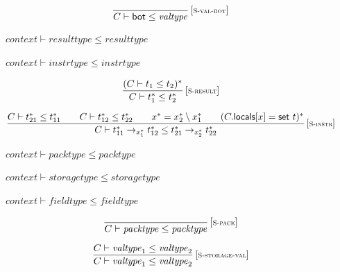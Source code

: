$$
\begin{array}{@{}c@{}}\displaystyle
\frac{
}{
C \vdash \mathsf{bot} \leq {\mathit{valtype}}
} \, {[\textsc{\scriptsize S{-}val{-}bot}]}
\qquad
\end{array}
$$

\vspace{1ex}

$\boxed{{\mathit{context}} \vdash {\mathit{resulttype}} \leq {\mathit{resulttype}}}$

$\boxed{{\mathit{context}} \vdash {\mathit{instrtype}} \leq {\mathit{instrtype}}}$

$$
\begin{array}{@{}c@{}}\displaystyle
\frac{
(C \vdash t_1 \leq t_2)^\ast
}{
C \vdash {t_1^\ast} \leq {t_2^\ast}
} \, {[\textsc{\scriptsize S{-}result}]}
\qquad
\end{array}
$$

$$
\begin{array}{@{}c@{}}\displaystyle
\frac{
C \vdash {t_{21}^\ast} \leq {t_{11}^\ast}
 \qquad
C \vdash {t_{12}^\ast} \leq {t_{22}^\ast}
 \qquad
{x^\ast} = {x_2^\ast} \setminus {x_1^\ast}
 \qquad
(C{.}\mathsf{locals}{}[x] = \mathsf{set}~t)^\ast
}{
C \vdash {t_{11}^\ast} \rightarrow_{{x_1^\ast}} {t_{12}^\ast} \leq {t_{21}^\ast} \rightarrow_{{x_2^\ast}} {t_{22}^\ast}
} \, {[\textsc{\scriptsize S{-}instr}]}
\qquad
\end{array}
$$

\vspace{1ex}

$\boxed{{\mathit{context}} \vdash {\mathit{packtype}} \leq {\mathit{packtype}}}$

$\boxed{{\mathit{context}} \vdash {\mathit{storagetype}} \leq {\mathit{storagetype}}}$

$\boxed{{\mathit{context}} \vdash {\mathit{fieldtype}} \leq {\mathit{fieldtype}}}$

\vspace{1ex}

$$
\begin{array}{@{}c@{}}\displaystyle
\frac{
}{
C \vdash {\mathit{packtype}} \leq {\mathit{packtype}}
} \, {[\textsc{\scriptsize S{-}pack}]}
\qquad
\end{array}
$$

\vspace{1ex}

$$
\begin{array}{@{}c@{}}\displaystyle
\frac{
C \vdash {\mathit{valtype}}_1 \leq {\mathit{valtype}}_2
}{
C \vdash {\mathit{valtype}}_1 \leq {\mathit{valtype}}_2
} \, {[\textsc{\scriptsize S{-}storage{-}val}]}
\qquad
\end{array}
$$


